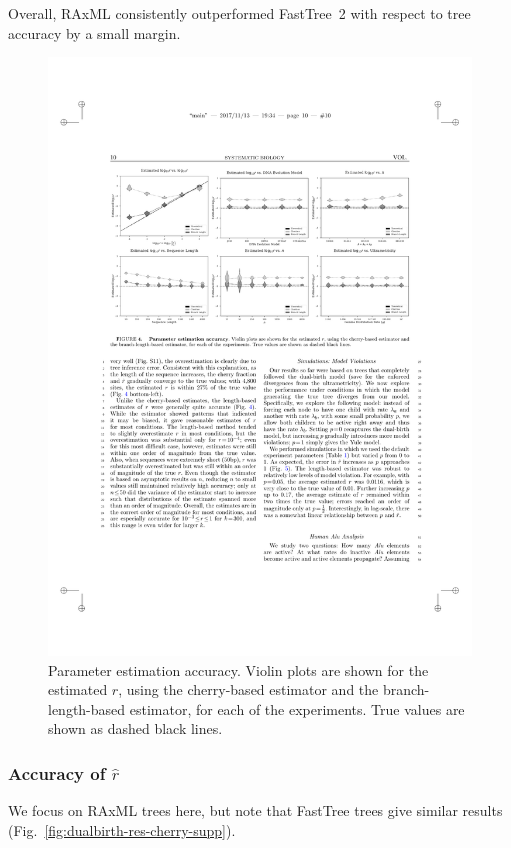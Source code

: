 Overall, RAxML consistently outperformed FastTree~2 with respect to tree accuracy by a small margin.

\begin{figure} %
\centering
\includegraphics[width=\textwidth]{figs/dualbirth-param-est-accuracy}
\caption[Parameter Estimation Accuracy]
{Parameter estimation accuracy. Violin plots are shown for the estimated $r$, using the cherry-based estimator and the branch-length-based estimator, for each of the experiments. True values are shown as dashed black lines.}
\label{fig:dualbirth-param-est-accuracy}
\end{figure}

\subsubsection{Accuracy of $\hat{r}$}\label{accuracy-cherries}
We focus on RAxML trees here, but note that FastTree trees give similar results (Fig.~\ref{fig:dualbirth-res-cherry-supp}).


